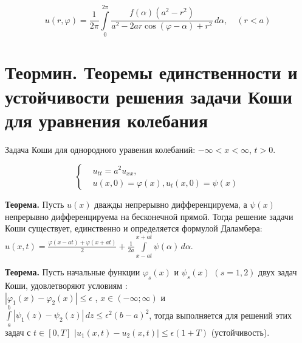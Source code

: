 \documentclass[11pt,a4paper]{article}
\begin{document}
    \begin{equation}
    u(r,\varphi)=\frac{1}{2\pi}\int\limits_0^{2\pi} \frac{f(\alpha)(a^2-r^2)}{a^2-2ar\cos{(\varphi-\alpha)}+r^2}\,d\alpha, \quad (r<a)
    \end{equation}
    
    \section{Теормин. Теоремы единственности и устойчивости решения задачи Коши для уравнения колебания}
    Задача Коши для однородного уравения колебаний: $-\infty<x<\infty$, $t>0$.
    
    \[ \left\{\begin{aligned}
    &u_{tt}=a^2u_{xx}, \\ & u(x,0)=\varphi(x), u_t(x,0)=\psi(x)
    \end{aligned}\right. \]
    
    \textbf{Теорема.}
    Пусть $u(x)$ дважды непрерывно дифференцируема, а $\psi(x)$ непрерывно дифференцируема на бесконечной прямой. Тогда решение задачи Коши существует, единственно и определяется формулой Даламбера:\\ $u(x,t)=\frac{\varphi(x-at)+\varphi(x+at)}{2}+\frac{1}{2a}\int\limits_{x-at}^{x+at} \psi(\alpha) \,d\alpha$.
    
    \textbf{Теорема.}
    Пусть начальные функции $\varphi_s(x)$ и $\psi_s(x)$ $(s=1,2)$ двух задач Коши, удовлетворяют условиям :\\
    $|\varphi_1(x)-\varphi_2(x)|\leq \epsilon$ , $x\in (-\infty ; \infty)$
    и $\int\limits_a^b |\psi_1(z)-\psi_2(z)| \,dz \leq \epsilon^2(b-a)^2 $,
    тогда выполняется для решений этих задач с $t\in[0,T]$ $|u_1(x,t)-u_2(x,t)|\leq\epsilon(1+T)$ (устойчивость).

    
\end{document}
